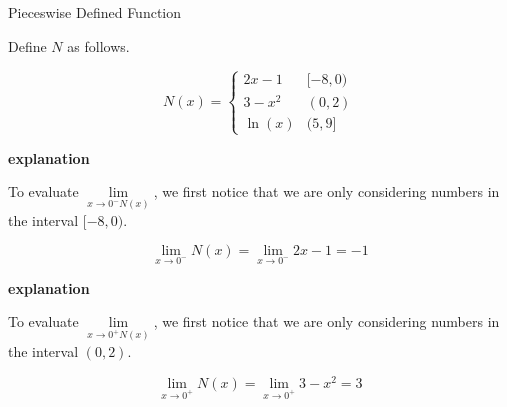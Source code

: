 \documentclass{ximera}
\begin{document}
\begin{example} Pieceswise Defined Function

Define $N$ as follows.


\[
N(x) = 
\begin{cases}
  2x - 1   &    [-8, 0)     \\
  3 - x^2  &    (0, 2) \\
  \ln(x)    &    (5, 9]
\end{cases}
\]






\textbf{\textcolor{red!75!green}{explanation}} 


To evaluate $\lim\limits_{x \to 0^- N(x)}$, we first notice that we are only considering numbers in the interval $[-8, 0)$.


\[
\lim\limits_{x \to 0^-} N(x) = \lim\limits_{x \to 0^-} 2x - 1 = -1
\]












\textbf{\textcolor{red!75!green}{explanation}} 


To evaluate $\lim\limits_{x \to 0^+ N(x)}$, we first notice that we are only considering numbers in the interval $(0,2)$.


\[
\lim\limits_{x \to 0^+} N(x) = \lim\limits_{x \to 0^+} 3 - x^2 = 3
\]









\end{example}
\end{document}
